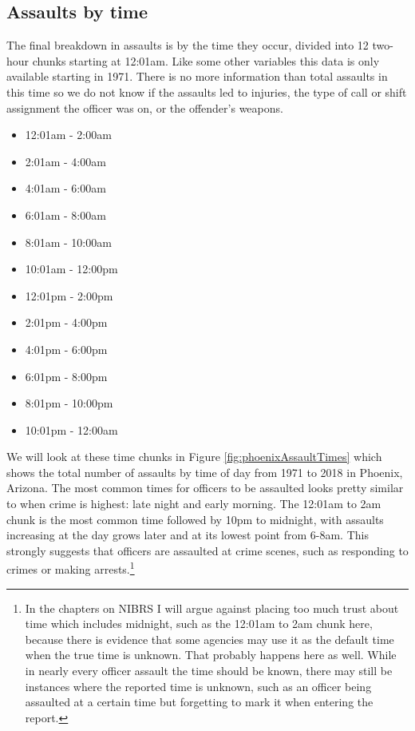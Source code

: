 \documentclass[
]{krantz}
\providecommand{\tightlist}{%
  \setlength{\itemsep}{0pt}\setlength{\parskip}{0pt}}
\begin{document}
\subsection{Assaults by time}\label{assaults-by-time}

The final breakdown in assaults is by the time they occur,
divided into 12 two-hour chunks starting at 12:01am. Like
some other variables this data is only available starting in
1971. There is no more information than total assaults in
this time so we do not know if the assaults led to injuries,
the type of call or shift assignment the officer was on, or
the offender's weapons.

\begin{itemize}
\tightlist
\item
  12:01am - 2:00am
\item
  2:01am - 4:00am
\item
  4:01am - 6:00am
\item
  6:01am - 8:00am
\item
  8:01am - 10:00am
\item
  10:01am - 12:00pm
\item
  12:01pm - 2:00pm
\item
  2:01pm - 4:00pm
\item
  4:01pm - 6:00pm
\item
  6:01pm - 8:00pm
\item
  8:01pm - 10:00pm
\item
  10:01pm - 12:00am
\end{itemize}

We will look at these time chunks in Figure
\ref{fig:phoenixAssaultTimes} which shows the total number
of assaults by time of day from 1971 to 2018 in Phoenix,
Arizona. The most common times for officers to be assaulted
looks pretty similar to when crime is highest: late night
and early morning. The 12:01am to 2am chunk is the most
common time followed by 10pm to midnight, with assaults
increasing at the day grows later and at its lowest point
from 6-8am. This strongly suggests that officers are
assaulted at crime scenes, such as responding to crimes or
making arrests.\footnote{In the chapters on NIBRS I will
  argue against placing too much trust about time which
  includes midnight, such as the 12:01am to 2am chunk here,
  because there is evidence that some agencies may use it as
  the default time when the true time is unknown. That
  probably happens here as well. While in nearly every
  officer assault the time should be known, there may still
  be instances where the reported time is unknown, such as
  an officer being assaulted at a certain time but
  forgetting to mark it when entering the report.}
\end{document}
